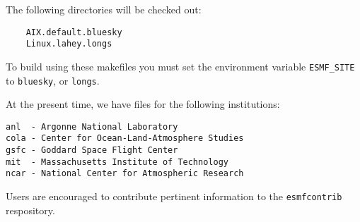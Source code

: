 The following directories will be checked out:

\begin{verbatim}
	AIX.default.bluesky
	Linux.lahey.longs
\end{verbatim}

To build using these makefiles you must set the environment 
variable {\tt ESMF\_SITE} to {\tt bluesky}, or {\tt longs}.

At the present time, we have files for the following institutions:

\begin{verbatim}
anl  - Argonne National Laboratory
cola - Center for Ocean-Land-Atmosphere Studies
gsfc - Goddard Space Flight Center
mit  - Massachusetts Institute of Technology
ncar - National Center for Atmospheric Research
\end{verbatim}


Users are encouraged to contribute pertinent information to the 
{\tt esmfcontrib} respository.




